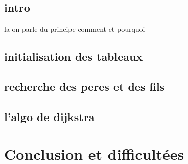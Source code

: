 \documentclass[a4]{article}
\begin{document}
		\subsection{intro}
			la on parle du principe comment et pourquoi
		\subsection{initialisation des tableaux}
			
		\subsection{recherche des peres et des fils}
			
		\subsection{l'algo de dijkstra}
			
	\section{Conclusion et difficultées}
		
\end{document}
